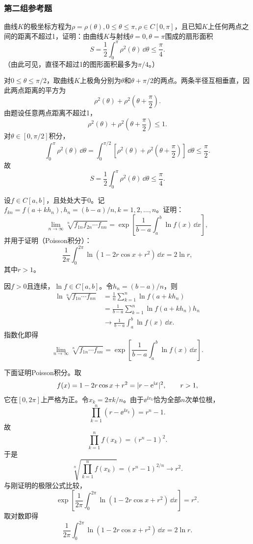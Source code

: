 \subsubsection*{第二组参考题}

\begin{xreferenceproblem}[1]
曲线$K$的极坐标方程为$\rho=\rho(\theta),0\le\theta\le\pi,\rho\in C[0,\pi]$，且已知$K$上任何两点之间的距离不超过1，证明：由曲线$K$与射线$\theta=0,\theta=\pi$围成的扇形面积
  \[
    S=\frac12\int_0^\pi\rho^2(\theta)\,\dd\theta\le\frac\pi4.
  \]
  （由此可见，直径不超过1的图形面积最多为$\pi/4$。）
\end{xreferenceproblem}
\begin{xsolution}
对$0\le\theta\le\pi/2$，取曲线$K$上极角分别为$\theta$和$\theta+\pi/2$的两点。两条半径互相垂直，因此两点距离的平方为
\[
 \rho^2(\theta)+\rho^2\left(\theta+\frac\pi2\right).
\]
由题设任意两点距离不超过1，
\[
 \rho^2(\theta)+\rho^2\left(\theta+\frac\pi2\right)\le1.
\]
对$\theta\in[0,\pi/2]$积分，
\[
 \int_0^\pi\rho^2(\theta)\,\dd\theta
 =\int_0^{\pi/2}\left[
 \rho^2(\theta)+\rho^2\left(\theta+\frac\pi2\right)
 \right]\,\dd\theta
 \le\frac\pi2.
\]
故
\[
 S=\frac12\int_0^\pi\rho^2(\theta)\,\dd\theta
 \le\boxed{\frac\pi4}.
\]
\end{xsolution}


\begin{xreferenceproblem}[2]
设$f\in C[a,b]$，且处处大于0。记$f_{kn}=f(a+kh_n),h_n=(b-a)/n,k=1,2,\ldots,n$。证明：
  \[
    \lim_{n\to\infty}\sqrt[n]{f_{1n}f_{2n}\cdots f_{nn}}
    =\exp\left[\frac1{b-a}\int_a^b\ln f(x)\,\dd x\right],
  \]
  并用于证明（Poisson积分）：
  \[
    \frac1{2\pi}\int_0^{2\pi}\ln(1-2r\cos x+r^2)\,\dd x=2\ln r,
  \]
  其中$r>1$。
\end{xreferenceproblem}
\begin{xsolution}
因$f>0$且连续，$\ln f\in C[a,b]$。令$h_n=(b-a)/n$，则
\begin{align*}
\ln\sqrt[n]{f_{1n}\cdots f_{nn}}
&=\frac1n\sum_{k=1}^n\ln f(a+kh_n)\\
&=\frac1{b-a}\sum_{k=1}^n\ln f(a+kh_n)h_n\\
&\longrightarrow\frac1{b-a}\int_a^b\ln f(x)\,\dd x.
\end{align*}
指数化即得
\[
 \lim_{n\to\infty}\sqrt[n]{f_{1n}\cdots f_{nn}}
 =\exp\left[\frac1{b-a}\int_a^b\ln f(x)\,\dd x\right].
\]

下面证明Poisson积分。取
\[
 f(x)=1-2r\cos x+r^2=\lvert r-\mathrm{e}^{\mathrm{i} x}\rvert^2,
 \qquad r>1,
\]
它在$[0,2\pi]$上严格为正。令$x_k=2\pi k/n$。由于$\ee^{\ii x_k}$恰为全部$n$次单位根，
\[
 \prod_{k=1}^n(r-\ee^{\ii x_k})=r^n-1.
\]
故
\[
 \prod_{k=1}^nf(x_k)=(r^n-1)^2.
\]
于是
\[
 \sqrt[n]{\prod_{k=1}^nf(x_k)}=(r^n-1)^{2/n}\longrightarrow r^2.
\]
与刚证明的极限公式比较，
\[
 \exp\left[\frac1{2\pi}\int_0^{2\pi}
 \ln(1-2r\cos x+r^2)\,\dd x\right]=r^2.
\]
取对数即得
\[
 \boxed{\frac1{2\pi}\int_0^{2\pi}
 \ln(1-2r\cos x+r^2)\,\dd x=2\ln r}.
\]
\end{xsolution}


